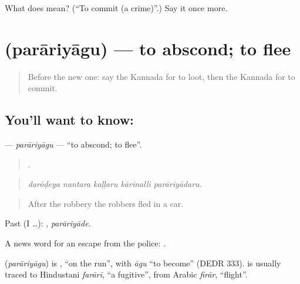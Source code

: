 \begin{tcolorbox}[breakable,colback=teal!4,colframe=teal!35!black,title={Before you move on}]
What does  mean? (\textquotedblleft{}To commit (a crime)\textquotedblright{}.) Say it once more.
\end{tcolorbox}
\section[\texorpdfstring{\kn{ಪರಾರಿಯಾಗು} (parāriyāgu)}{ಪರಾರಿಯಾಗು (parāriyāgu)}]{ (parāriyāgu) — to abscond; to flee}

\label{lesson:KA-C328-parariyagu}



\begin{quote}
Before the new one: say the Kannada for to loot, then the Kannada for to commit.
\end{quote}

\subsection*{You'll want to know: }
\textbf{} — \emph{parāriyāgu} — \textquotedblleft{}to abscond; to flee\textquotedblright{}.

\begin{quote}
    .
\end{quote}

\begin{quote}
\emph{darōḍeya nantara kaḷḷaru kārinalli parāriyādaru.}
\end{quote}

\begin{quote}
After the robbery the robbers fled in a car.
\end{quote}

Past (I …): , \emph{parāriyāde}.

A news word for an escape from the police:  .

\begin{cousinweb}
\textbf{} (\emph{parāriyāgu}) is , \textquotedblleft{}on the run\textquotedblright{}, with \emph{āgu} \textquotedblleft{}to become\textquotedblright{} (DEDR 333).  is usually traced to Hindustani \emph{farārī}, \textquotedblleft{}a fugitive\textquotedblright{}, from Arabic \emph{firār}, \textquotedblleft{}flight\textquotedblright{}.
\end{cousinweb}


